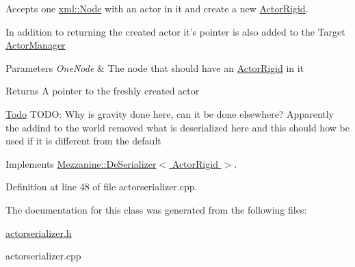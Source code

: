 Accepts one \hyperlink{classMezzanine_1_1xml_1_1Node}{xml::Node} with an actor in it and create a new \hyperlink{classMezzanine_1_1ActorRigid}{ActorRigid}. 

In addition to returning the created actor it's pointer is also added to the Target \hyperlink{classMezzanine_1_1ActorManager}{ActorManager} 
\begin{DoxyParams}{Parameters}
{\em OneNode} & The node that should have an \hyperlink{classMezzanine_1_1ActorRigid}{ActorRigid} in it \\
\hline
\end{DoxyParams}
\begin{DoxyReturn}{Returns}
A pointer to the freshly created actor 
\end{DoxyReturn}


\begin{Desc}
\item[\hyperlink{todo__todo000003}{Todo}]TODO: Why is gravity done here, can it be done elsewhere? Apparently the addind to the world removed what is deserialized here and this should how be used if it is different from the default \end{Desc}




Implements \hyperlink{classMezzanine_1_1DeSerializer_a646390cf8138c622c64aa83a93b10cce}{Mezzanine::DeSerializer$<$ ActorRigid $>$}.



Definition at line 48 of file actorserializer.cpp.



The documentation for this class was generated from the following files:\begin{DoxyCompactItemize}
\item 
\hyperlink{actorserializer_8h}{actorserializer.h}\item 
actorserializer.cpp\end{DoxyCompactItemize}
